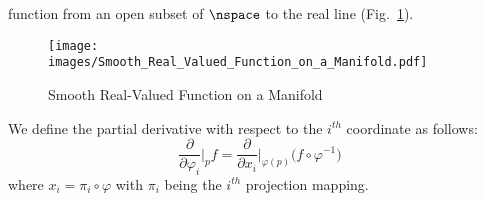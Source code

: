 \documentclass{book}                                                           %
\begin{document}
                function from an open subset of $\nspace$ to the real line 
                (Fig.~\ref{fig:Partials_on_Manifold}).
                \begin{figure}
                    \centering
                    \captionsetup{type=figure}
                    \texttt{[image: images/Smooth\_Real\_Valued\_Function\_on\_a\_Manifold.pdf]}
                    \caption{Smooth Real-Valued Function on a Manifold}
                    \label{fig:Partials_on_Manifold}
                \end{figure}
                We define the partial derivative with respect to the
                $i^{th}$ coordinate as follows:
                \begin{equation}
                    \frac{\partial}{\partial{\varphi}_{i}}\Big|_{p}f
                    =\frac{\partial}{\partial{x}_{i}}\Big|_{\varphi(p)}
                        \big(f\circ\varphi^{\minus{1}}\big)
                \end{equation}
                where $x_{i}=\pi_{i}\circ\varphi$ with $\pi_{i}$ being the
                $i^{th}$ projection mapping.
\end{document}
